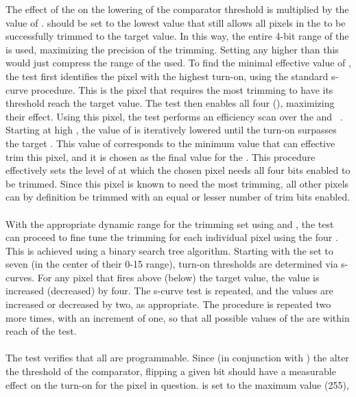 The effect of the \trimbits on the lowering of the comparator threshold is multiplied by the value of \vtrim.
\vtrim should be set to the lowest value that still allows all pixels in the \roc to be successfully trimmed to the target value.
In this way, the entire 4-bit range of the \trimbits is used, maximizing the precision of the trimming.
Setting \vtrim any higher than this would just compress the range of the \trimbits used.
To find the minimal effective value of \vtrim, the test first identifies the pixel with the highest \vcal turn-on, 
using the standard s-curve procedure.
This is the pixel that requires the most trimming to have its \vcal threshold reach the target value.
The test then enables all four \trimbits (), maximizing their effect.
Using this pixel, the test performs an efficiency scan over the \vtrim and \vcal~\dacs.
Starting at high \vtrim, the value of \vtrim is iteratively lowered until the \vcal turn-on surpasses the target \vcal.
This value of \vtrim corresponds to the minimum value that can effective trim this pixel, 
and it is chosen as the final \vtrim value for the \roc.
This procedure effectively sets the level of \vtrim at which the chosen pixel needs all four bits enabled to be trimmed.
Since this pixel is known to need the most trimming, 
all other pixels can by definition be trimmed with an equal or lesser number of trim bits enabled.
\\\\
With the appropriate dynamic range for the trimming set using \vthrcomp and \vtrim, 
the test can proceed to fine tune the trimming for each individual pixel using the four \trimbits.
This is achieved using a binary search tree algorithm.
Starting with the \trimbits set to seven (in the center of their 0-15 range), 
\vcal turn-on thresholds are determined via s-curves.
For any pixel that fires above (below) the target \vcal value, the \trimbits value is increased (decreased) by four.
The s-curve test is repeated, and the \trimbits values are increased or decreased by two, as appropriate.
The procedure is repeated two more times, with an increment of one, so that all possible values of the \trimbits are within reach of the test.
\\\\
The \trimbit test verifies that all \trimbits are programmable.
Since (in conjunction with \vtrim) the \trimbits alter the threshold of the comparator,
flipping a given bit should have a measurable effect on the \vcal turn-on for the pixel in question.
\vtrim is set to the maximum value (255),
